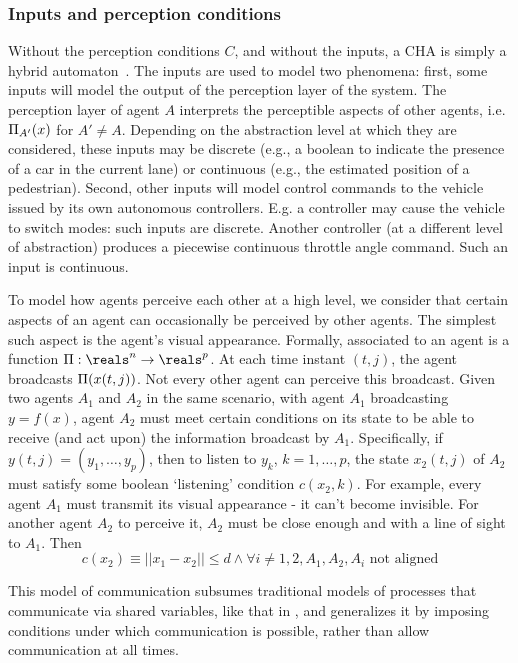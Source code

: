 \subsubsection{Inputs and perception conditions}
\label{inputsPerceptionConditions}
Without the perception conditions $C$, and without the inputs, a CHA is simply a hybrid automaton~\cite{Henzinger96}.
The inputs are used to model two phenomena: 
first, some inputs will model the output of the perception layer of the system. 
The perception layer of agent $A$ interprets the perceptible aspects of other agents, i.e. $\Pi_{A'}(x)$ for $A'\neq A$.
Depending on the abstraction level at which they are considered, these inputs may be discrete (e.g., a boolean to indicate the presence of a car in the current lane) or continuous (e.g., the estimated position of a pedestrian).
Second, other inputs will model control commands to the vehicle issued by its own autonomous controllers. 
E.g. a controller may cause the vehicle to switch modes: such inputs are discrete. 
Another controller (at a different level of abstraction) produces a piecewise continuous throttle angle command. Such an input is continuous. 

To model how agents perceive each other at a high level, we consider that certain aspects of an agent can occasionally be perceived by other agents.
The simplest such aspect is the agent's visual appearance.
Formally, associated to an agent is a function $\funcOut:\reals^n \rightarrow \reals^p$.
At each time instant $(t,j)$, the agent broadcasts $\Pi(x(t,j))$.
Not every other agent can perceive this broadcast.
Given two agents $A_1$ and $A_2$ in the same scenario, with agent $A_1$ broadcasting $y = f(x)$, agent $A_2$ must meet certain conditions on its state to be able to receive (and act upon) the information broadcast by $A_1$.
Specifically, if $y(t,j) = (y_1,\ldots,y_p)$, then to listen to $y_k$, $k=1,\ldots,p$, the state $x_2(t,j)$ of $A_2$ must satisfy some boolean `listening' condition $c(x_2,k)$.
For example, every agent $A_1$ must transmit its visual appearance - it can't become invisible.
For another agent $A_2$ to perceive it, $A_2$ must be close enough and with a line of sight to $A_1$. 
Then 
\[c(x_2) \equiv ||x_1 - x_2 || \leq d \land \forall i\neq 1,2, A_1,A_2,A_i \text{ not aligned}\]

This model of communication subsumes traditional models of processes that communicate via shared variables, like that in , and generalizes it by imposing conditions under which communication is possible, rather than allow communication at all times.

